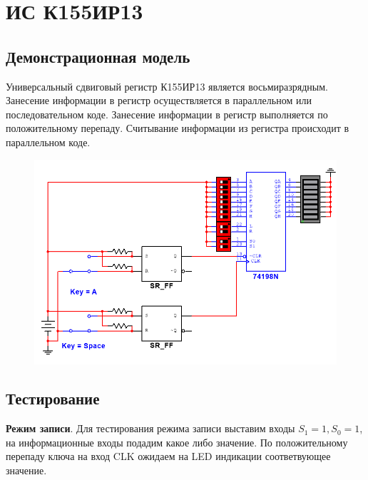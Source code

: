 \section*{ИС К155ИР13}
\subsection*{Демонстрационная модель}

Универсальный сдвиговый регистр К155ИР13 является восьмиразрядным. Занесение
информации в регистр осуществляется в параллельном или последовательном коде.
Занесение информации в регистр выполняется по положительному перепаду. 
Считывание информации из регистра происходит в параллельном коде.

\begin{figure}[h!]
    \centering
    \includegraphics[scale=0.6]{images/image-2.png}
\end{figure}

\subsection*{Тестирование}


\textbf{Режим записи}. Для тестирования режима записи выставим входы $S_1=1,S_0=1$, 
на информационные входы подадим какое либо значение. По положительному перепаду ключа на вход
CLK ожидаем на LED индикации соответвующее значение.  

